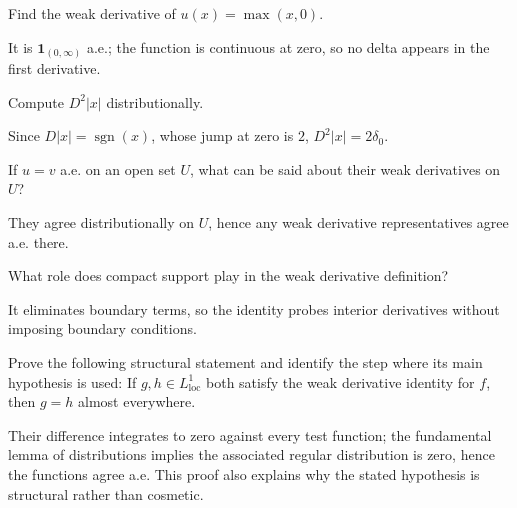 \begin{problem}\label{prob:iii20-problem-05}
Find the weak derivative of \(u(x)=\max(x,0)\).
\end{problem}
\begin{solution}
It is \(\mathbf1_{(0,\infty)}\) a.e.; the function is continuous at zero,
so no delta appears in the first derivative.
\end{solution}

\begin{problem}\label{prob:iii20-problem-06}
Compute \(D^2|x|\) distributionally.
\end{problem}
\begin{solution}
Since \(D|x|=\operatorname{sgn}(x)\), whose jump at zero is \(2\),
\(D^2|x|=2\delta_0\).
\end{solution}

\begin{problem}[Locality]\label{prob:iii20-problem-07}
If \(u=v\) a.e. on an open set \(U\), what can be said about their weak derivatives on \(U\)?
\end{problem}
\begin{solution}
They agree distributionally on \(U\), hence any weak derivative
representatives agree a.e. there.
\end{solution}

\begin{problem}\label{prob:iii20-problem-08}
What role does compact support play in the weak derivative definition?
\end{problem}
\begin{solution}
It eliminates boundary terms, so the identity probes interior derivatives
without imposing boundary conditions.
\end{solution}

\begin{problem}\label{prob:iii20-problem-09}
Prove the following structural statement and identify the step where its main hypothesis is used: If $g,h\in L^1_{\mathrm{loc}}$ both satisfy the weak derivative identity for $f$, then $g=h$ almost everywhere.
\end{problem}
\begin{solution}
Their difference integrates to zero against every test function; the fundamental lemma of distributions implies the associated regular distribution is zero, hence the functions agree a.e. This proof also explains why the stated hypothesis is structural rather than cosmetic.
\end{solution}

